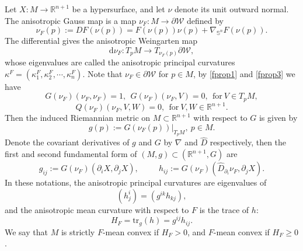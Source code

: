 \documentclass[10pt,a4paper]{amsart}
\numberwithin{equation}{section}
\begin{document}
	Let $X:M\to\mathbb{R}^{n+1}$ be a hypersurface, and let $\nu$ denote its unit outward normal. The anisotropic Gauss map  is a map $\nu_F:M \to \partial\mathcal{W}$ defined by
	\begin{equation*}
    \nu_F(p):=DF(\nu(p))=F(\nu(p))\nu(p)+\nabla_{\mathbb{S}^n}F(\nu(p)).
	\end{equation*}
	The differential gives the anisotropic Weingarten map 
    \begin{equation*}
		\mathrm{d}\nu_F : T_{p}M \to T_{\nu_F(p)}\partial\mathcal{W},
	\end{equation*}
whose eigenvalues are called the  anisotropic principal curvatures $\kappa^{F}=\left( \kappa_1^F,\kappa_2^F,\cdots,\kappa_n^F \right)$.	
	Note that $\nu_F \in \partial\mathcal{W}$ for $p\in M$, by \eqref{fprop1} and \eqref{fprop3} we have
	\begin{equation*}
		G(\nu_F)(\nu_F,\nu_F)=1,\ \ G(\nu_F)(\nu_F,V)=0,\ \ \text{for}\ V\in T_{p}M,
	\end{equation*}
	\begin{equation}
		Q(\nu_F)(\nu_F,V,W)=0,\ \ \text{for}\ V,W\in\mathbb{R}^{n+1}.
		\label{equ-q}
	\end{equation}
	Then the induced Riemannian metric on $M\subset\mathbb{R}^{n+1}$ with respect to $G$ is given by
	\begin{equation*}
		g(p):= G\left(\nu_F(p)\right)|_{T_p M},\ p\in M.
	\end{equation*}
	Denote the covariant derivatives of $g$ and $G$ by $\nabla$ and $\hat{D}$ respectively, then the first and second fundamental form of $(M,g)\subset (\mathbb{R}^{n+1},G)$ are
	\begin{equation*}
		g_{ij}:= G(\nu_{F})(\partial_i X,\partial_j X),\ \ \qquad h_{ij}:= G(\nu_F)(\hat{D}_{\partial_i}\nu_F,\partial_j X).
	\end{equation*}
	In these notations,  the anisotropic principal curvatures are eigenvalues of 
    \begin{equation*}
      \left(h^i_j\right)=\left(g^{ik}h_{kj}\right),
    \end{equation*}
and the anisotropic mean curvature with respect to $F$ is the trace of $h$: 
	\begin{equation*}
		H_F = \mathrm{tr}_{g}(h) = g^{ij}h_{ij}.
	\end{equation*}
	We say that $M$ is strictly $F$-mean convex if $H_F>0$, and $F$-mean convex if $H_F\geq 0$.
	
\end{document}
